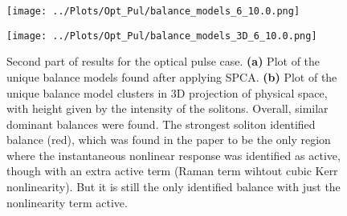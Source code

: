 \documentclass[12pt]{report} %
\begin{document}
\begin{figure}[htbp]
  \centering
  \begin{minipage}[b]{0.6\textwidth}
      \centering
      \texttt{[image: ../Plots/Opt\_Pul/balance\_models\_6\_10.0.png]}
      \subcaption{}
  \end{minipage}

  \begin{minipage}[b]{0.7\textwidth}
    \centering
    \texttt{[image: ../Plots/Opt\_Pul/balance\_models\_3D\_6\_10.0.png]}
    \subcaption{}
  \end{minipage}

  \caption{Second part of results for the optical pulse case. \textbf{(a)} Plot of the unique balance models found after applying SPCA. \textbf{(b)} Plot of the unique balance model clusters in 3D projection of physical space, with height given by the intensity of the solitons. Overall, similar dominant balances were found. The strongest soliton identified balance (red), which was found in the paper to be the only region where the instantaneous nonlinear response was identified as active, though with an extra active term (Raman term wihtout cubic Kerr nonlinearity). But it is still the only identified balance with just the nonlinearity term active.}
  \label{fig:Opt_Pul_results_2}
\end{figure}






\end{document}
